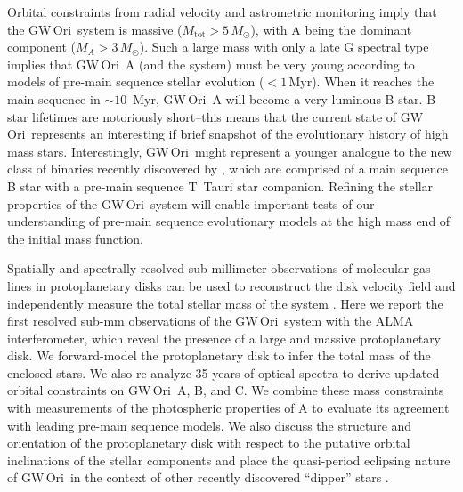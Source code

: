 \documentclass[twocolumn]{aastex61}
\newcommand{\todo}[1]{ \textcolor{red}{#1}}
\newcommand{\gw}{GW\,Ori}
\begin{document}

Orbital constraints from radial velocity \citep{mathieu91,fang14} and astrometric \citep{berger11} monitoring imply that the \gw\ system is massive ($M_\mathrm{tot} > 5\,M_\odot$), with A being the dominant component ($M_A > 3\, M_\odot$). Such a large mass with only a late G spectral type implies that \gw\ A (and the system) must be very young according to models of pre-main sequence stellar evolution ($< 1$\,Myr).
When it reaches the main sequence in $\sim$$10\,$ Myr, \gw\ A will become a very luminous B star. B star lifetimes are notoriously short--this means that the current state of \gw\ represents an interesting if brief snapshot of the evolutionary history of high mass stars. Interestingly, \gw\ might represent a younger analogue to the new class of binaries recently discovered by \citet{moe15}, which are comprised of a main sequence B star with a pre-main sequence T~Tauri star companion. Refining the stellar properties of the \gw\ system will enable important tests of our understanding of pre-main sequence evolutionary models at the high mass end of the initial mass function.


Spatially and spectrally resolved sub-millimeter observations of molecular gas lines in protoplanetary disks can be used to reconstruct the disk velocity field and independently measure the total stellar mass of the system \citep[e.g.,][]{rosenfeld12b,czekala15a,czekala16}. Here we report the first resolved sub-mm observations of the \gw\ system with the ALMA interferometer, which reveal the presence of a large and massive protoplanetary disk. We forward-model the protoplanetary disk to infer the total mass of the enclosed stars. We also re-analyze 35 years of optical spectra to derive updated orbital constraints on \gw\ A, B, and C. We combine these mass constraints with measurements of the photospheric properties of A to evaluate its agreement with leading pre-main sequence models. We also discuss the structure and orientation of the protoplanetary disk with respect to the putative orbital inclinations of the stellar components and place the quasi-period eclipsing nature of \gw\ in the context of other recently discovered ``dipper'' stars \citep[e.g.,][]{ansdell16b,ansdell16a}.
\end{document}
